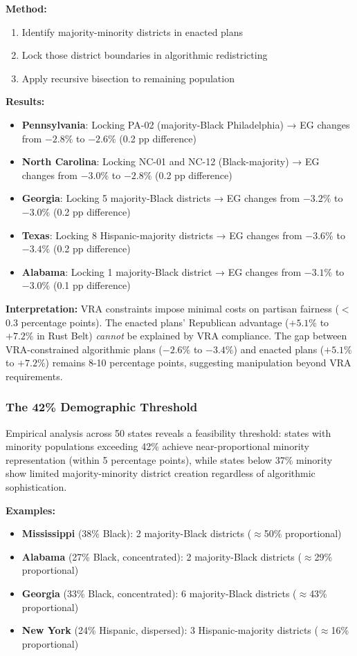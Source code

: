 \textbf{Method:}
\begin{enumerate}
    \item Identify majority-minority districts in enacted plans
    \item Lock those district boundaries in algorithmic redistricting
    \item Apply recursive bisection to remaining population
\end{enumerate}

\textbf{Results:}
\begin{itemize}
    \item \textbf{Pennsylvania}: Locking PA-02 (majority-Black Philadelphia) → EG changes from $-2.8\%$ to $-2.6\%$ (0.2 pp difference)
    \item \textbf{North Carolina}: Locking NC-01 and NC-12 (Black-majority) → EG changes from $-3.0\%$ to $-2.8\%$ (0.2 pp difference)
    \item \textbf{Georgia}: Locking 5 majority-Black districts → EG changes from $-3.2\%$ to $-3.0\%$ (0.2 pp difference)
    \item \textbf{Texas}: Locking 8 Hispanic-majority districts → EG changes from $-3.6\%$ to $-3.4\%$ (0.2 pp difference)
    \item \textbf{Alabama}: Locking 1 majority-Black district → EG changes from $-3.1\%$ to $-3.0\%$ (0.1 pp difference)
\end{itemize}

\textbf{Interpretation:} VRA constraints impose minimal costs on partisan fairness ($<$0.3 percentage points). The enacted plans' Republican advantage ($+5.1\%$ to $+7.2\%$ in Rust Belt) \emph{cannot} be explained by VRA compliance. The gap between VRA-constrained algorithmic plans ($-2.6\%$ to $-3.4\%$) and enacted plans ($+5.1\%$ to $+7.2\%$) remains 8-10 percentage points, suggesting manipulation beyond VRA requirements.

\subsubsection{The 42\% Demographic Threshold}

Empirical analysis across 50 states reveals a feasibility threshold: states with minority populations exceeding 42\% achieve near-proportional minority representation (within 5 percentage points), while states below 37\% minority show limited majority-minority district creation regardless of algorithmic sophistication.

\textbf{Examples:}
\begin{itemize}
    \item \textbf{Mississippi} (38\% Black): 2 majority-Black districts ($\approx$50\% proportional)
    \item \textbf{Alabama} (27\% Black, concentrated): 2 majority-Black districts ($\approx$29\% proportional)
    \item \textbf{Georgia} (33\% Black, concentrated): 6 majority-Black districts ($\approx$43\% proportional)
    \item \textbf{New York} (24\% Hispanic, dispersed): 3 Hispanic-majority districts ($\approx$16\% proportional)
\end{itemize}

